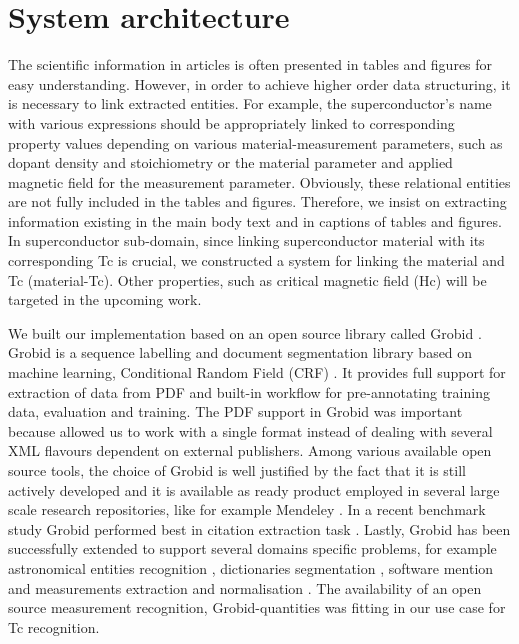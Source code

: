 \documentclass{article}[a4]
\begin{document}
\section{System architecture}
\label{sec:architecture}
The scientific information in articles is often presented in tables and figures for easy understanding. However, in order to achieve higher order data structuring, it is necessary to link extracted entities. For example, the superconductor’s name with various expressions should be appropriately linked to corresponding property values depending on various material-measurement parameters, such as dopant density and stoichiometry or the material parameter and applied magnetic field for the measurement parameter. Obviously, these relational entities are not fully included in the tables and figures. Therefore, we insist on extracting information existing in the main body text and in captions of tables and figures. In superconductor sub-domain, since linking superconductor material with its corresponding Tc is crucial, we constructed a system for linking the material and Tc (material-Tc). Other properties, such as critical magnetic field (Hc) will be targeted in the upcoming work.

We built our implementation based on an open source library called Grobid \cite{GROBID}. Grobid is a sequence labelling and document segmentation library based on machine learning, Conditional Random Field (CRF) \cite{lafferty2001conditional}. It provides full support for extraction of data from PDF and built-in workflow for pre-annotating training data, evaluation and training. The PDF support in Grobid was important because allowed us to work with a single format instead of dealing with several XML flavours dependent on external publishers. Among various available open source tools, the choice of Grobid is well justified by the fact that it is still actively developed and it is available as ready product employed in several large scale research repositories, like for example Mendeley \cite{mendeley-extraction}. In a recent benchmark study Grobid performed best in citation extraction task \cite{DBLP:journals/corr/abs-1802-01168}. Lastly, Grobid has been successfully extended to support several domains specific problems, for example astronomical entities recognition \cite{grobid-astro}, dictionaries segmentation \cite{khemakhem2017automatic}, software mention \cite{software-mentions} and measurements extraction and normalisation \cite{grobid-quantities}. The availability of an open source measurement recognition, Grobid-quantities was fitting in our use case for Tc recognition. 
\end{document}
